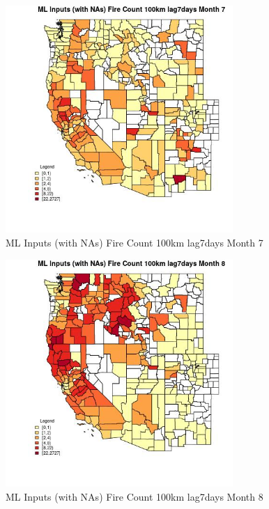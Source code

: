 \begin{figure} 
\centering  
\includegraphics[width=0.77\textwidth]{Code_Outputs/Report_ML_input_PM25_Step4_part_f_de_duplicated_aves_prioritize_24hr_obswNAs_CountyFire_Count_100km_lag7daysmedianMonth7.jpg} 
\caption{\label{fig:Report_ML_input_PM25_Step4_part_f_de_duplicated_aves_prioritize_24hr_obswNAsCountyFire_Count_100km_lag7daysmedianMonth7}ML Inputs (with NAs) Fire Count 100km lag7days Month 7} 
\end{figure} 
 

\begin{figure} 
\centering  
\includegraphics[width=0.77\textwidth]{Code_Outputs/Report_ML_input_PM25_Step4_part_f_de_duplicated_aves_prioritize_24hr_obswNAs_CountyFire_Count_100km_lag7daysmedianMonth8.jpg} 
\caption{\label{fig:Report_ML_input_PM25_Step4_part_f_de_duplicated_aves_prioritize_24hr_obswNAsCountyFire_Count_100km_lag7daysmedianMonth8}ML Inputs (with NAs) Fire Count 100km lag7days Month 8} 
\end{figure} 
 

